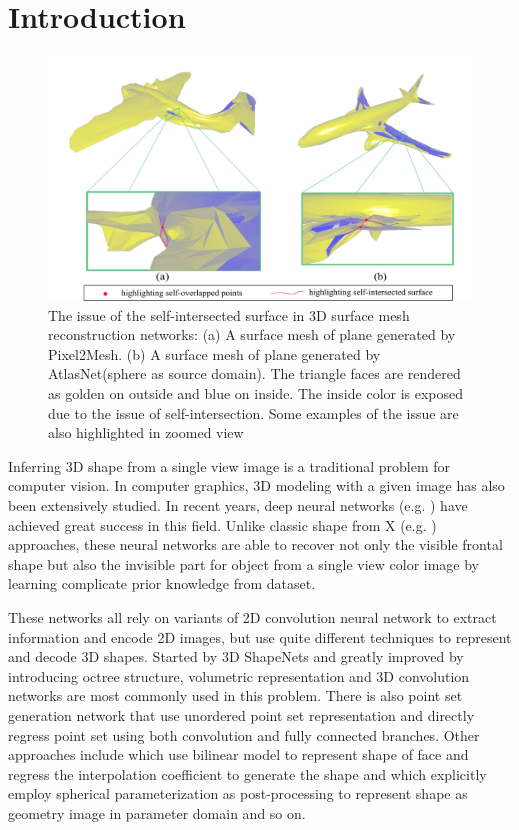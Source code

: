 \section{Introduction}
\begin{figure}[htbp]
	\centering
	\includegraphics[width=\linewidth]{img/issue/issue}
	\caption{The issue of the self-intersected surface in 3D surface mesh reconstruction networks: (a) A surface mesh of plane generated by Pixel2Mesh\cite{pixel2mesh}. (b) A surface mesh of plane generated by AtlasNet\cite{atlasnet}(sphere as source domain). The triangle faces are rendered as golden on outside and blue on inside. The inside color is exposed due to the issue of self-intersection. Some examples of the issue are also highlighted in zoomed view}
	\label{fig:issue}
\end{figure}
Inferring 3D shape from a single view image is a traditional problem for computer vision. In computer graphics, 3D modeling with a given image has also been extensively studied. In recent years, deep neural networks (e.g. \cite{3DR2N2,PSGN,3Drender,imgrecon15,3dshapenet,endface,octreegen,surfnet,shapeprior}) have achieved great success in this field. Unlike classic shape from X (e.g. \cite{shapefromshading,shapefromtext1,shapefromtext2}) approaches, these neural networks are able to recover not only the visible frontal shape but also the invisible part for object from a single view color image by learning complicate prior knowledge from dataset. 

These networks all rely on variants of 2D convolution neural network to extract information and encode 2D images, but use quite different techniques to represent and decode 3D shapes. Started by 3D ShapeNets\cite{3dshapenet} and greatly improved by introducing octree structure\cite{octreegen}, volumetric representation and 3D convolution networks are most commonly used in this problem. There is also point set generation network\cite{PSGN} that use unordered point set representation and directly regress point set using both convolution and fully connected branches. Other approaches include \cite{endface} which use bilinear model to represent shape of face and regress the interpolation coefficient to generate the shape and \cite{surfnet} which explicitly employ spherical parameterization as post-processing to represent shape as geometry image in parameter domain and so on.

